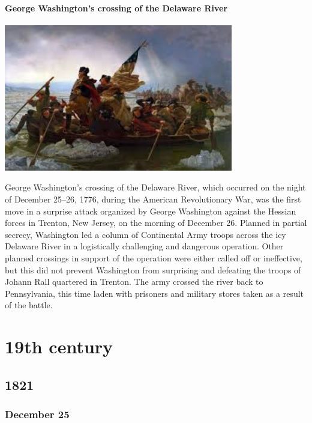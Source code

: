 \documentclass[11pt]{report}
\begin{document}
\subsection{George Washington's crossing of the Delaware River}
\vspace{2mm}\begin{center}\includegraphics[width=10cm]{./img/crossingDelaware.jpg}\end{center}
George Washington's crossing of the Delaware River, which occurred on the night of December 25–26, 1776, during the American Revolutionary War, was the first move in a surprise attack organized by George Washington against the Hessian forces in Trenton, New Jersey, on the morning of December 26. Planned in partial secrecy, Washington led a column of Continental Army troops across the icy Delaware River in a logistically challenging and dangerous operation. Other planned crossings in support of the operation were either called off or ineffective, but this did not prevent Washington from surprising and defeating the troops of Johann Rall quartered in Trenton. The army crossed the river back to Pennsylvania, this time laden with prisoners and military stores taken as a result of the battle.


										
			
\part{19th century}
\chapter{1821}
\section{December 25}
\end{document}

